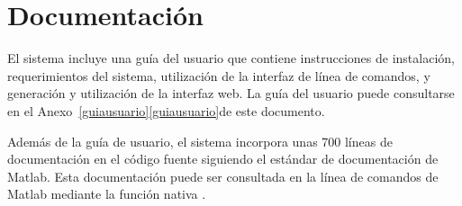 %
%
\section{Documentación}
%
El sistema incluye una guía del usuario que contiene instrucciones de
instalación, requerimientos del sistema, utilización de la interfaz de
línea de comandos, y generación y utilización de la interfaz web.
La guía del usuario puede consultarse en el
\iflatexml{}Anexo~\ref{guiausuario}\else\autoref{guiausuario}\fi de
este documento.

Además de la guía de usuario, el sistema incorpora unas 700 líneas de
documentación en el código fuente siguiendo el estándar de
documentación de Matlab.
Esta documentación puede ser consultada en la línea de comandos de
Matlab mediante la función nativa .
